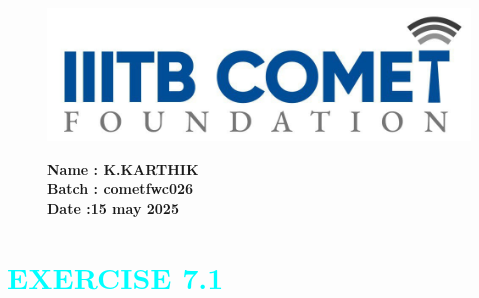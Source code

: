 \documentclass[a4paper,12pt]{article}
\begin{document}
\begin{figure}[h!]
    \begin{minipage}{0.45\textwidth}  %
        \includegraphics[width=\textwidth]{sun.png}  %
    \end{minipage} \hfill
    \begin{minipage}{0.45\textwidth}  %
        \textbf{Name : K.KARTHIK} \\
    \textbf{Batch : cometfwc026} \\
  \textbf{Date :15 may 2025}
    \end{minipage}
\end{figure}
\section*{\centering \textcolor{cyan}{EXERCISE 7.1}}
\end{document}
